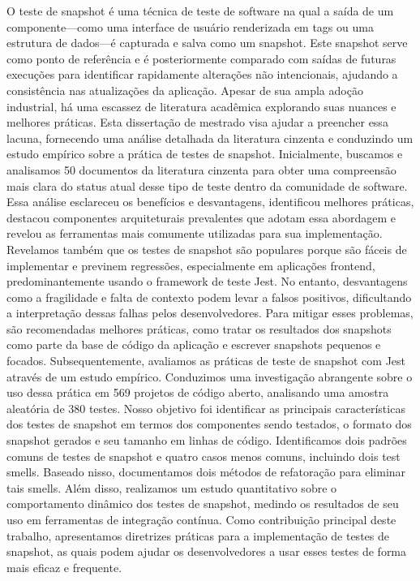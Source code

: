 O teste de snapshot é uma técnica de teste de software na qual a saída de um componente—como uma interface de usuário renderizada em tags ou uma estrutura de dados—é capturada e salva como um snapshot. Este snapshot serve como ponto de referência e é posteriormente comparado com saídas de futuras execuções para identificar rapidamente alterações não intencionais, ajudando a consistência nas atualizações da aplicação. Apesar de sua ampla adoção industrial, há uma escassez de literatura acadêmica explorando suas nuances e melhores práticas. Esta dissertação de mestrado visa ajudar a preencher essa lacuna, fornecendo uma análise detalhada da literatura cinzenta e conduzindo um estudo empírico sobre a prática de testes de snapshot. Inicialmente, buscamos e analisamos 50 documentos da literatura cinzenta para obter uma compreensão mais clara do status atual desse tipo de teste dentro da comunidade de software. Essa análise esclareceu os benefícios e desvantagens, identificou melhores práticas, destacou componentes arquiteturais prevalentes que adotam essa abordagem e revelou as ferramentas mais comumente utilizadas para sua implementação. Revelamos também que os testes de snapshot são populares porque são fáceis de implementar e previnem regressões, especialmente em aplicações frontend, predominantemente usando o framework de teste Jest. No entanto, desvantagens como a fragilidade e falta de contexto podem levar a falsos positivos, dificultando a interpretação dessas falhas pelos desenvolvedores. Para mitigar esses problemas, são recomendadas melhores práticas, como tratar os resultados dos snapshots como parte da base de código da aplicação e escrever snapshots pequenos e focados. Subsequentemente, avaliamos as práticas de teste de snapshot com Jest através de um estudo empírico. Conduzimos uma investigação abrangente sobre o uso dessa prática em 569 projetos de código aberto, analisando uma amostra aleatória de 380 testes. Nosso objetivo foi identificar as principais características dos testes de snapshot em termos dos componentes sendo testados, o formato dos snapshot gerados e seu tamanho em linhas de código. Identificamos dois padrões comuns de testes de snapshot e quatro casos menos comuns, incluindo dois test smells. Baseado nisso, documentamos dois métodos de refatoração para eliminar tais smells. Além disso, realizamos um estudo quantitativo sobre o comportamento dinâmico dos testes de snapshot, medindo os resultados de seu uso em ferramentas de integração contínua. Como contribuição principal deste trabalho, apresentamos diretrizes práticas para a implementação de testes de snapshot, as quais podem ajudar os desenvolvedores a usar esses testes de forma mais eficaz e frequente.